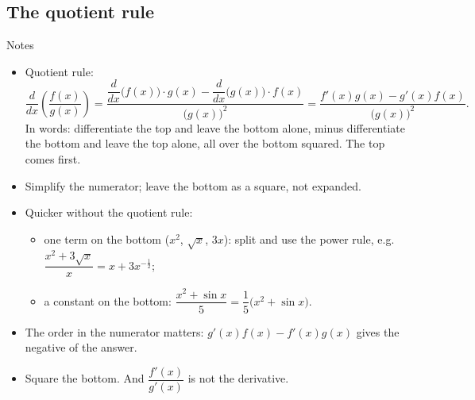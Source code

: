 \documentclass[11pt,a4paper]{article}
\newcommand{\steph}[1]{\par\addvspace{7pt}{\bfseries #1}\par\nobreak\vspace{2pt}}
\begin{document}
\subsection{The quotient rule}
\begin{notesbox}{Notes}
\begin{itemize}
 \item Quotient rule:
 \[
 \frac{d}{dx}\left(\frac{f(x)}{g(x)}\right)=\frac{\dfrac{d}{dx}\bigl(f(x)\bigr)\cdot g(x)-\dfrac{d}{dx}\bigl(g(x)\bigr)\cdot f(x)}{\bigl(g(x)\bigr)^2}=\frac{f'(x)g(x)-g'(x)f(x)}{\bigl(g(x)\bigr)^2}.
 \]
 In words: differentiate the top and leave the bottom alone, minus differentiate the bottom and leave the top alone, all over the bottom squared. The top comes first.
 \item Simplify the numerator; leave the bottom as a square, not expanded.
 \item Quicker without the quotient rule:
 \begin{itemize}
  \item one term on the bottom ($x^2$, $\sqrt x$, $3x$): split and use the power rule, e.g.\ $\dfrac{x^2+3\sqrt x}{x}=x+3x^{-\frac12}$;
  \item a constant on the bottom: $\dfrac{x^2+\sin x}{5}=\dfrac15\bigl(x^2+\sin x\bigr)$.
 \end{itemize}
\end{itemize}
\steph{Traps.}
\begin{itemize}
 \item The order in the numerator matters: $g'(x)f(x)-f'(x)g(x)$ gives the negative of the answer.
 \item Square the bottom. And $\dfrac{f'(x)}{g'(x)}$ is not the derivative.
\end{itemize}
\end{notesbox}
\end{document}
